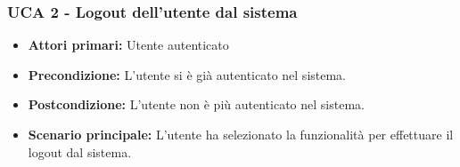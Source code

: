 \newpage
\subsubsection{UCA 2 - Logout dell'utente dal sistema}%
\begin{itemize}
\item \textbf{Attori primari:} Utente autenticato
\item \textbf{Precondizione:} L'utente si è già autenticato nel sistema.
\item \textbf{Postcondizione:}  L'utente non è più autenticato nel sistema.
\item \textbf{Scenario principale:} L'utente ha selezionato la funzionalità per effettuare il logout dal sistema.
\end{itemize}